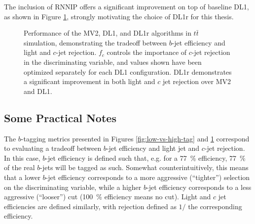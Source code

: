 The inclusion of RNNIP offers a significant improvement on top of baseline DL1, as shown in Figure 
\ref{fig:DL1-vs-DL1r}, strongly motivating the choice of DL1r for this thesis. 

\begin{figure}[ht]
\centering
{}
\caption{\label{fig:DL1-vs-DL1r} Performance of the MV2, DL1, and DL1r algorithms in $t\bar{t}$ simulation, 
demonstrating the tradeoff between $b$-jet efficiency and light and $c$-jet rejection. $f_{c}$ controls the 
importance of $c$-jet rejection in the discriminating variable, and values shown have been optimized separately 
for each DL1 configuration. DL1r demonstrates a significant improvement in both light and $c$ jet rejection over 
MV2 and DL1.~\cite{PFlowPublicPlots2019}}
\end{figure}


\subsection{Some Practical Notes}
The $b$-tagging metrics presented in Figures \ref{fig:low-vs-high-tag} and \ref{fig:DL1-vs-DL1r} correspond 
to evaluating a tradeoff between $b$-jet efficiency and light jet and $c$-jet rejection. In this case, $b$-jet 
efficiency is defined such that, e.g. for a 77~\% efficiency, 77~\% of the real $b$-jets will be tagged 
as such. Somewhat counterintuitively, this means that a lower $b$-jet efficiency corresponds 
to a more aggressive (``tighter'') selection on the discriminating variable, while a higher 
$b$-jet efficiency corresponds to a less aggressive (``looser'') cut (100~\% efficiency means 
no cut). Light and $c$ jet efficiencies are defined similarly, with rejection defined as $1 /$ the 
corresponding efficiency.

